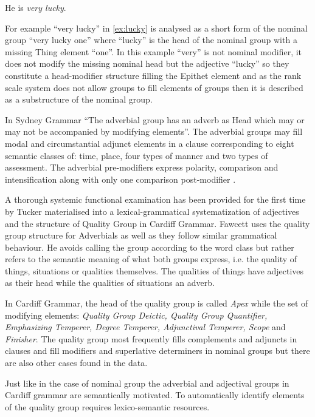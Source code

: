 	\begin{exe}
		\ex\label{ex:lucky} He is \textit{very lucky}.
	\end{exe}
	
	For example ``very lucky'' in \ref{ex:lucky} is analysed as a short form of the nominal group ``very lucky one'' where ``lucky'' is the head of the nominal group with a missing Thing element ``one''. In this example ``very'' is not nominal modifier, it does not modify the missing nominal head but the adjective ``lucky'' so they constitute a head-modifier structure filling the Epithet element and as the rank scale system does not allow groups to fill elements of groups then it is described as a substructure of the nominal group.
	
	In Sydney Grammar ``The adverbial group has an adverb as Head which may or may not be accompanied by modifying elements''\citep[419]{Halliday2013}. The adverbial groups may fill modal and circumstantial adjunct elements in a clause corresponding to eight semantic classes of: time, place, four types of manner and two types of assessment. The adverbial pre-modifiers express polarity, comparison and intensification along with only one comparison post-modifier \citep[420-421]{Halliday2013}. 
	
	
	A thorough systemic functional examination has been provided for the first time by Tucker \citet{Tucker1997,Tucker1998} materialised into a lexical-grammatical systematization of adjectives and the structure of Quality Group in Cardiff Grammar. Fawcett uses the quality group structure for Adverbials as well as they follow similar grammatical behaviour. He avoids calling the group according to the word class but rather refers to the semantic meaning of what both groups express, i.e. the quality of things, situations or qualities themselves. The qualities of things have adjectives as their head while the qualities of situations an adverb. 
	
	In Cardiff Grammar, the head of the quality group is called \textit{Apex} while the set of modifying elements: \textit{Quality Group Deictic, Quality Group Quantifier, Emphasizing Temperer, Degree Temperer, Adjunctival Temperer, Scope} and \textit{Finisher}. The quality group most frequently fills complements and adjuncts in clauses and fill modifiers and superlative determiners in nominal groups but there are also other cases found in the data. 
	
	Just like in the case of nominal group the adverbial and adjectival groups in Cardiff grammar are semantically motivated. To automatically identify elements of the quality group requires lexico-semantic resources.
    
